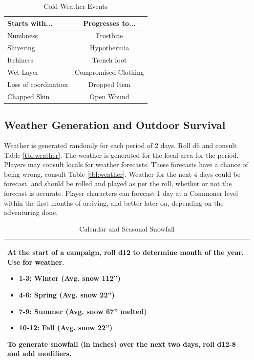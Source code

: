 \documentclass[notitlepage]{article}
\begin{document}
\begin{multicols*}{2}
\begin{table}[t]
  \centering
  \begin{tabular}{|p{}|c|}
    \hline Starts with... & Progresses to... \\ \hline
    Numbness & Frostbite \\
    Shivering & Hypothermia \\
    Itchiness & Trench foot \\
    Wet Layer & Compromised Clothing \\ 
    Loss of coordination & Dropped Item \\
    Chapped Skin & Open Wound \\ \hline
  \end{tabular}
  \caption{Cold Weather Events}
  \label{tab:cold-events}
\end{table}

\subsection*{Weather Generation and Outdoor Survival}
\label{sec:weather-outdoor}

Weather is generated randomly for each period of 2 days. Roll d6 and consult Table \ref{tbl:weather}. The weather is generated for the local area for the period. \\

Players may consult locals for weather forecasts.
These forecasts have a chance of being wrong, consult Table \ref{tbl:weather}.
Weather for the next 4 days could be forecast, and should be rolled and played as per the roll, whether or not the forecast is accurate.
Player characters can forecast 1 day at a Commoner level within the first months of arriving, and better later on, depending on the adventuring done. \\

\begin{table}
  \centering
  \begin{tabular}{|p{}|}
    \hline
    At the start of a campaign, roll d12 to determine month of the year. Use for weather.
    \begin{itemize}
    \item 1-3: Winter (Avg. snow 112'')
    \item 4-6: Spring (Avg. snow 22'')
    \item 7-9: Summer (Avg. snow 67'' melted)
    \item 10-12: Fall (Avg. snow 22'')
    \end{itemize}
    To generate snowfall (in inches) over the next two days, roll d12-8 and add modifiers. \\ \hline
  \end{tabular}
  \caption{Calendar and Seasonal Snowfall}
  \label{tab:calendar}
\end{table}



\end{multicols*}
\end{document}
